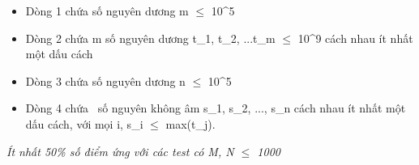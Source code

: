 \begin{itemize}
	\item     Dòng 1 chứa số nguyên dương m  $\le$  10^5   
	\item     Dòng 2 chứa m số nguyên dương t\_1, t\_2, ...t\_m  $\le$  10^9 cách nhau ít nhất một dấu cách   
	\item     Dòng 3 chứa số nguyên dương n  $\le$  10^5   
	\item     Dòng 4 chứa     số nguyên không âm s\_1, s\_2, ..., s\_n cách nhau ít nhất một dấu cách, với mọi i, s\_i  $\le$  max(t\_j).   
\end{itemize}

\emph{    Ít nhất 50\% số điểm ứng với các test có M, N  $\le$  1000   }\emph{}

\